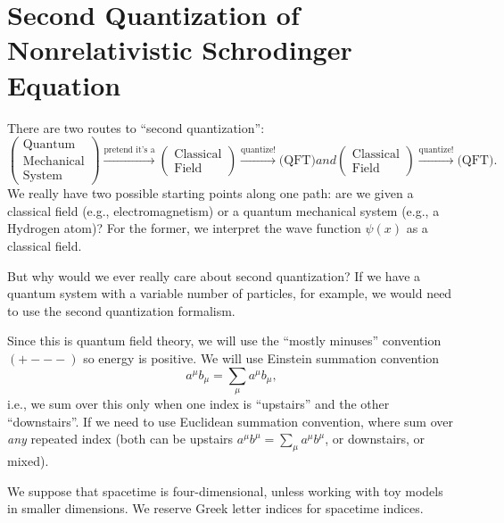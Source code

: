 \section{Second Quantization of Nonrelativistic Schrodinger Equation}
\M
There are two routes to ``second quantization'':
\begin{subequations}
\begin{equation}
\begin{pmatrix}
\mbox{Quantum}\\
\mbox{Mechanical}\\
\mbox{System}
\end{pmatrix}
\xrightarrow{\text{pretend it's a}}
\begin{pmatrix}
\mbox{Classical}\\
\mbox{Field}
\end{pmatrix}
\xrightarrow{\text{quantize!}}
\mbox{(QFT)}
\end{equation}
and
\begin{equation}
\begin{pmatrix}
\mbox{Classical}\\
\mbox{Field}
\end{pmatrix}
\xrightarrow{\text{quantize!}}
\mbox{(QFT)}.
\end{equation}
\end{subequations}
We really have two possible starting points along one path: are we given
a classical field (e.g., electromagnetism) or a quantum mechanical
system (e.g., a Hydrogen atom)? For the former, we interpret the wave
function $\psi(x)$ as a classical field.

But why would we ever really care about second quantization? If we have
a quantum system with a variable number of particles, for example, we
would need to use the second quantization formalism.

Since this is quantum field theory, we will use the ``mostly minuses''
convention $(+---)$ so energy is positive. We will use Einstein
summation convention
\begin{equation}
a^{\mu}b_{\mu}=\sum_{\mu}a^{\mu}b_{\mu},
\end{equation}
i.e., we sum over this only when one index is ``upstairs'' and the other
``downstairs''. If we need to use Euclidean summation convention, where
sum over \emph{any} repeated index (both can be upstairs
$a^{\mu}b^{\mu}=\sum_{\mu}a^{\mu}b^{\mu}$, or downstairs, or mixed).

We suppose that spacetime is four-dimensional, unless working with toy
models in smaller dimensions. We reserve Greek letter indices for
spacetime indices.

